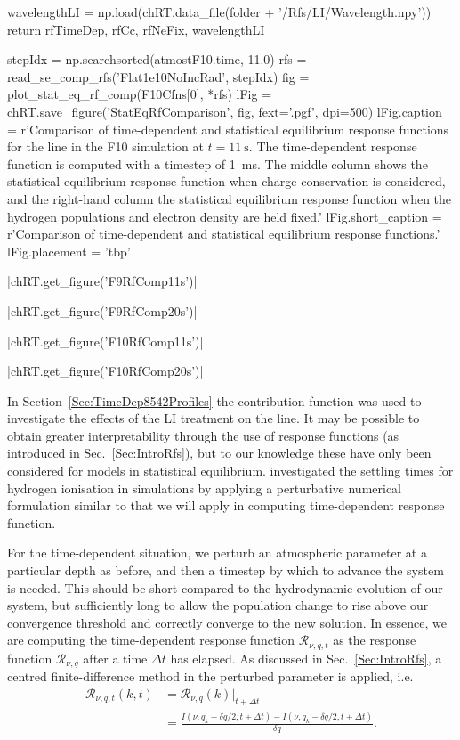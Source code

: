 \begin{pycode}[TimeDepRT]
    wavelengthLI = np.load(chRT.data_file(folder + '/Rfs/LI/Wavelength.npy'))
    return rfTimeDep, rfCc, rfNeFix, wavelengthLI

stepIdx = np.searchsorted(atmostF10.time, 11.0)
rfs = read_se_comp_rfs('Flat1e10NoIncRad', stepIdx)
fig = plot_stat_eq_rf_comp(F10Cfns[0], *rfs)
lFig = chRT.save_figure('StatEqRfComparison', fig, fext='.pgf', dpi=500)
lFig.caption = r'Comparison of time-dependent and statistical equilibrium response functions for the \CaLine{} line in the F10 simulation at $t=\SI{11}{\s}$. The time-dependent response function is computed with a timestep of \SI{1}{\milli\s}. The middle column shows the statistical equilibrium response function when charge conservation is considered, and the right-hand column the statistical equilibrium response function when the hydrogen populations and electron density are held fixed.'
lFig.short_caption = r'Comparison of time-dependent and statistical equilibrium response functions.'
lFig.placement = 'tbp'
\end{pycode}

\py[TimeDepRT]|chRT.get_figure('F9RfComp11s')|

\py[TimeDepRT]|chRT.get_figure('F9RfComp20s')|

\py[TimeDepRT]|chRT.get_figure('F10RfComp11s')|

\py[TimeDepRT]|chRT.get_figure('F10RfComp20s')|

In Section~\ref{Sec:TimeDep8542Profiles} the contribution function was used to investigate the effects of the LI treatment on the \CaLine{} line.
It may be possible to obtain greater interpretability through the use of response functions (as introduced in Sec.~\ref{Sec:IntroRfs}), but to our knowledge these have only been considered for models in statistical equilibrium.
\citet{Carlsson2002} investigated the settling times for hydrogen ionisation in \Radyn{} simulations by applying a perturbative numerical formulation similar to that we will apply in computing time-dependent response function.

For the time-dependent situation, we perturb an atmospheric parameter at a particular depth as before, and then a timestep by which to advance the system is needed.
This should be short compared to the hydrodynamic evolution of our system, but sufficiently long to allow the population change to rise above our convergence threshold and correctly converge to the new solution.
In essence, we are computing the time-dependent response function $\mathcal{R}_{\nu, q,t}$ as the response function $\mathcal{R}_{\nu, q}$ after a time $\Delta t$ has elapsed.
As discussed in Sec.~\ref{Sec:IntroRfs}, a centred finite-difference method in the perturbed parameter is applied, i.e.
\begin{equation}
\begin{aligned}
    \mathcal{R}_{\nu, q, t}(k, t) &= \mathcal{R}_{\nu, q}(k) \bigg|_{t + \Delta t}\\
    &= \frac{I(\nu, q_k + \delta q /2, t + \Delta t) - I(\nu, q_k - \delta q / 2, t+\Delta t)}{\delta q}.
\end{aligned}
\end{equation}

